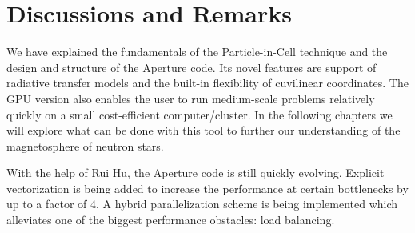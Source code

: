 

\section{Discussions and Remarks}
\label{sec:code-discussions}

We have explained the fundamentals of the Particle-in-Cell technique and the
design and structure of the Aperture code. Its novel features are support of
radiative transfer models and the built-in flexibility of cuvilinear
coordinates. The GPU version also enables the user to run medium-scale problems
relatively quickly on a small cost-efficient computer/cluster. In the following
chapters we will explore what can be done with this tool to further our
understanding of the magnetosphere of neutron stars.

With the help of Rui Hu, the Aperture code is still quickly evolving. Explicit
vectorization is being added to increase the performance at certain bottlenecks
by up to a factor of 4. A hybrid parallelization scheme is being implemented
which alleviates one of the biggest performance obstacles: load balancing.

